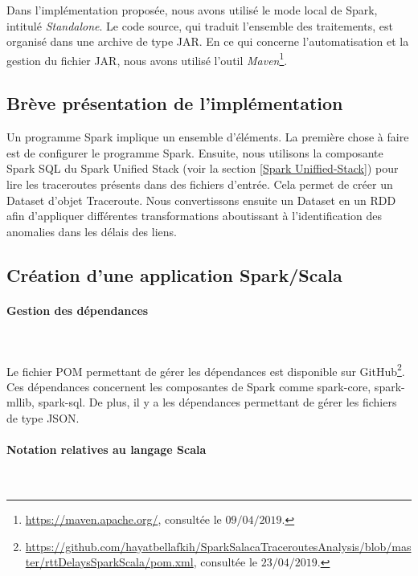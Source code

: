 Dans l'implémentation proposée, nous avons utilisé le mode local de Spark, intitulé \textit{Standalone}. 
Le code source, qui traduit l'ensemble des traitements, est organisé dans une archive de type JAR.
En ce qui concerne  l'automatisation et la gestion du fichier JAR, nous avons utilisé l'outil \textit{Maven}\footnote{\url{https://maven.apache.org/}, consultée le $09/04/2019$.}.


\subsection{Brève présentation  de l'implémentation}

Un programme Spark implique un ensemble d'éléments. La première chose à faire est de configurer le programme Spark.
Ensuite, nous utilisons la composante Spark SQL   du Spark Unified Stack (voir la section \ref{Spark Uniffied-Stack}) pour lire les traceroutes présents dans des fichiers d'entrée. Cela permet de créer un Dataset d'objet Traceroute.  Nous convertissons ensuite un Dataset en un RDD afin d'appliquer différentes transformations aboutissant à l'identification des anomalies dans les délais des liens.

\subsection{Création d'une application Spark/Scala}

\paragraph{Gestion des dépendances}~

Le fichier POM permettant de gérer les dépendances est disponible sur GitHub\footnote{\url{https://github.com/hayatbellafkih/SparkSalacaTraceroutesAnalysis/blob/master/rttDelaysSparkScala/pom.xml}, consultée le $23/04/2019$.}. Ces dépendances concernent les composantes de Spark comme spark-core, spark-mllib, spark-sql. De plus, il y a les dépendances permettant de gérer les fichiers de type JSON.


\paragraph{Notation relatives au langage Scala}~

